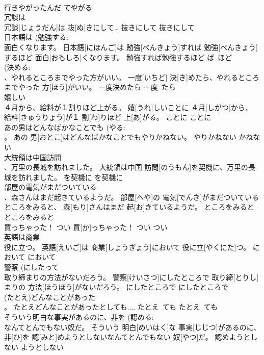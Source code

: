 \documentclass[8pt]{extreport}
\begin{document}
\begin{CJK}{UTF8}{min}
\\	行きやがったんだ	てやがる	
\\	冗談は 
\\	冗談[じょうだん]は 抜[ぬ]きにして…	抜きにして	抜きにして	
\\	日本語は (勉強する: 
\\	面白くなります。	日本語[にほんご]は 勉強[べんきょう]すれば 勉強[べんきょう]するほど 面白[おもしろ]くなります。	勉強すれば勉強するほど	ば~ほど	
\\	(決める: 
\\	、やれるところまでやった方がいい。	一度[いちど] 決[き]めたら、やれるところまでやった 方[ほう]がいい。	一度決めたら	一度~たら~	
\\	嬉しい 
\\	４月から、給料が１割りほど上がる。	嬉[うれ]しいことに ４月[しがつ]から、 給料[きゅうりょう]が１ 割[わ]りほど 上[あ]がる。	ことに	ことに	
\\	あの男はどんなばかなことでも (やる: 
\\	。	あの 男[おとこ]はどんなばかなことでもやりかねない。	やりかねない	かねない	
\\	大統領は中国訪問
\\	、万里の長城を訪れました。	大統領は中国 訪問[のうもん]を契機に、万里の長城を訪れました。	を契機に	を契機に	
\\	部屋の電気がまだついている 
\\	、森さんはまだ起きているようだ。	部屋[へや]の 電気[でんき]がまだついているところをみると、 森[もり]さんはまだ 起[お]きているようだ。	ところをみると	ところをみると	
\\	買っちゃった！	つい 買[か]っちゃった！	つい	つい~	
\\	英語は商業 
\\	役に立つ。	英語[えいご]は 商業[しょうぎょう]において 役に立[やくにた]つ。	において	において	
\\	警察 (にしたって 
\\	取り締まりの方法がないだろう。	警察[けいさつ]にしたところで 取り締[とりし]まりの 方法[ほうほう]がないだろう。	にしたところで	にしたところで	
\\	(たとえ)どんなことがあった 
\\	。	たとえどんなことがあったとしても....	たとえ~ても	たとえ~ても	
\\	そういう明白な事実があるのに、非を (認める: 
\\	なんてとんでもない奴だ。	そういう 明白[めいはく]な 事実[じじつ]があるのに、 非[ひ]を 認[みと]めようとしないなんてとんでもない 奴[やつ]だ。	認めようとしない	ようとしない	

\end{CJK}
\end{document}

